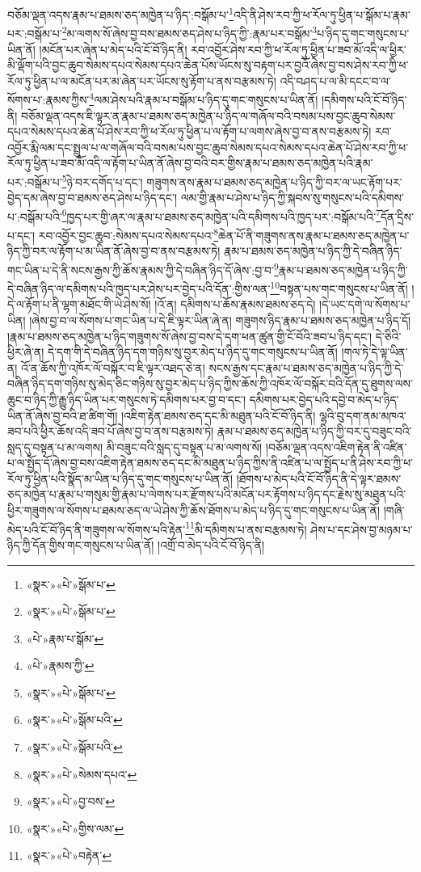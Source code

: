 བཅོམ་ལྡན་འདས་རྣམ་པ་ཐམས་ཅད་མཁྱེན་པ་ཉིད་:བསྒོམ་པ་\footnote{«སྣར་»«པེ་»སྒོམ་པ་}འདི་ནི་ཤེས་རབ་ཀྱི་ཕ་རོལ་ཏུ་ཕྱིན་པ་སྒོམ་པ་རྣམ་པར་:བསྒོམ་པ་\footnote{«སྣར་»«པེ་»སྒོམ་པ་}མ་ལགས་སོ་ཞེས་བྱ་བས་ཐམས་ཅད་ཤེས་པ་ཉིད་ཀྱི་:རྣམ་པར་བསྒོམ་\footnote{«པེ་»རྣམ་པ་སྒོམ་}པ་ཉིད་དུ་གང་གསུངས་པ་ཡིན་ནོ། །མངོན་པར་ཞེན་པ་མེད་པའི་ངོ་བོ་ཉིད་ནི། རབ་འབྱོར་ཤེས་རབ་ཀྱི་ཕ་རོལ་ཏུ་ཕྱིན་པ་ཟབ་མོ་འདི་ལ་ཕྱིར་མི་ལྡོག་པའི་བྱང་ཆུབ་སེམས་དཔའ་སེམས་དཔའ་ཆེན་པོས་ཡོངས་སུ་བརྟག་པར་བྱའོ་ཞེས་བྱ་བས་ཤེས་རབ་ཀྱི་ཕ་རོལ་ཏུ་ཕྱིན་པ་ལ་མངོན་པར་མ་ཞེན་པར་ཡོངས་སུ་རྟོག་པ་ནས་བརྩམས་ཏེ། འདི་བཤད་པ་ལ་མི་དངང་བ་ལ་སོགས་པ་:རྣམས་ཀྱིས་\footnote{«པེ་»རྣམས་ཀྱི་}ལམ་ཤེས་པའི་རྣམ་པ་བསྒོམ་པ་ཉིད་དུ་གང་གསུངས་པ་ཡིན་ནོ། །དམིགས་པའི་ངོ་བོ་ཉིད་ནི། བཅོམ་ལྡན་འདས་ཇི་ལྟར་ན་རྣམ་པ་ཐམས་ཅད་མཁྱེན་པ་ཉིད་ལ་གཞོལ་བའི་བསམ་པས་བྱང་ཆུབ་སེམས་དཔའ་སེམས་དཔའ་ཆེན་པོ་ཤེས་རབ་ཀྱི་ཕ་རོལ་ཏུ་ཕྱིན་པ་ལ་རྟོག་པ་ལགས་ཞེས་བྱ་བ་ནས་བརྩམས་ཏེ། རབ་འབྱོར་རྨི་ལམ་དང་སྤྲུལ་པ་ལ་གཞོལ་བའི་བསམ་པས་བྱང་ཆུབ་སེམས་དཔའ་སེམས་དཔའ་ཆེན་པོ་ཤེས་རབ་ཀྱི་ཕ་རོལ་ཏུ་ཕྱིན་པ་ཟབ་མོ་འདི་ལ་རྟོག་པ་ཡིན་ནོ་ཞེས་བྱ་བའི་བར་གྱིས་རྣམ་པ་ཐམས་ཅད་མཁྱེན་པའི་རྣམ་པར་:བསྒོམ་པ་\footnote{«སྣར་»«པེ་»སྒོམ་པ་}ཉེ་བར་དགོད་པ་དང་། གཟུགས་ནས་རྣམ་པ་ཐམས་ཅད་མཁྱེན་པ་ཉིད་ཀྱི་བར་ལ་ཡང་རྟོག་པར་བྱེད་དམ་ཞེས་བྱ་བ་ཐམས་ཅད་ཤེས་པ་ཉིད་དང་། ལམ་གྱི་རྣམ་པ་ཤེས་པ་ཉིད་ཀྱི་སྐབས་སུ་གསུངས་པའི་དམིགས་པ་:བསྒོམ་པའི་\footnote{«སྣར་»«པེ་»སྒོམ་པའི་}ཁྱད་པར་གྱི་ཞར་ལ་རྣམ་པ་ཐམས་ཅད་མཁྱེན་པའི་དམིགས་པའི་ཁྱད་པར་:བསྒོམ་པའི་\footnote{«སྣར་»«པེ་»སྒོམ་པའི་}དོན་དྲིས་པ་དང་། རབ་འབྱོར་བྱང་ཆུབ་:སེམས་དཔའ་སེམས་དཔའ་\footnote{«སྣར་»«པེ་»སེམས་དཔའ་}ཆེན་པོ་ནི་གཟུགས་ནས་རྣམ་པ་ཐམས་ཅད་མཁྱེན་པ་ཉིད་ཀྱི་བར་ལ་རྟོག་པ་མ་ཡིན་ནོ་ཞེས་བྱ་བ་ནས་བརྩམས་ཏེ། རྣམ་པ་ཐམས་ཅད་མཁྱེན་པ་ཉིད་ཀྱི་དེ་བཞིན་ཉིད་གང་ཡིན་པ་དེ་ནི་སངས་རྒྱས་ཀྱི་ཆོས་རྣམས་ཀྱི་དེ་བཞིན་ཉིད་དོ་ཞེས་:བྱ་བ་\footnote{«སྣར་»«པེ་»བྱ་བས་}རྣམ་པ་ཐམས་ཅད་མཁྱེན་པ་ཉིད་ཀྱི་དེ་བཞིན་ཉིད་ལ་དམིགས་པའི་ཁྱད་པར་ཤེས་པར་བྱེད་པའི་དོན་:གྱིས་ལན་\footnote{«སྣར་»«པེ་»གྱིས་ལམ་}བསྟན་པས་གང་གསུངས་པ་ཡིན་ནོ། །དེ་ལ་རྟོག་པ་ནི་ལྷག་མཐོང་གི་ཡེ་ཤེས་སོ། །འོ་ན། དམིགས་པ་ཆོས་རྣམས་ཐམས་ཅད་དེ། །དེ་ཡང་དགེ་ལ་སོགས་པ་ཡིན། །ཞེས་བྱ་བ་ལ་སོགས་པ་གང་ཡིན་པ་དེ་ཇི་ལྟར་ཡིན་ཞེ་ན། གཟུགས་ཉིད་རྣམ་པ་ཐམས་ཅད་མཁྱེན་པ་ཉིད་དོ། །རྣམ་པ་ཐམས་ཅད་མཁྱེན་པ་ཉིད་གཟུགས་སོ་ཞེས་བྱ་བས་དེ་དག་ཕན་ཚུན་གྱི་ངོ་བོའི་ཟབ་པ་ཉིད་དང་། དེ་ཅིའི་ཕྱིར་ཞེ་ན། དེ་དག་གི་དེ་བཞིན་ཉིད་དག་གཉིས་སུ་བྱར་མེད་པ་ཉིད་དུ་གང་གསུངས་པ་ཡིན་ནོ། །གལ་ཏེ་དེ་ལྟ་ཡིན་ན། འོ་ན་ཆོས་ཀྱི་འཁོར་ལོ་བསྐོར་བ་ཇི་ལྟར་འཐད་ཅེ་ན། སངས་རྒྱས་དང་རྣམ་པ་ཐམས་ཅད་མཁྱེན་པ་ཉིད་ཀྱི་དེ་བཞིན་ཉིད་དག་གཉིས་སུ་མེད་ཅིང་གཉིས་སུ་བྱར་མེད་པ་ཉིད་ཀྱིས་ཆོས་ཀྱི་འཁོར་ལོ་བསྐོར་བའི་དོན་དུ་ཐུགས་ལས་ཆུང་བ་ཉིད་ཀྱི་རྒྱུ་ཉིད་ཡིན་པར་གསུངས་ཏེ་དམིགས་པར་བྱ་བ་དང་། དམིགས་པར་བྱེད་པའི་དབྱེ་བ་མེད་པ་ཉིད་ཡིན་ནོ་ཞེས་བྱ་བའི་ཐ་ཚིག་གོ། །འཇིག་རྟེན་ཐམས་ཅད་དང་མི་མཐུན་པའི་ངོ་བོ་ཉིད་ནི། ལྷའི་བུ་དག་ནམ་མཁའ་ཟབ་པའི་ཕྱིར་ཆོས་འདི་ཟབ་པོ་ཞེས་བྱ་བ་ནས་བརྩམས་ཏེ། རྣམ་པ་ཐམས་ཅད་མཁྱེན་པ་ཉིད་ཀྱི་བར་དུ་བཟུང་བའི་སླད་དུ་བསྟན་པ་མ་ལགས། མི་བཟུང་བའི་སླད་དུ་བསྟན་པ་མ་ལགས་སོ། །བཅོམ་ལྡན་འདས་འཇིག་རྟེན་ནི་འཛིན་པ་ལ་སྤྱོད་དོ་ཞེས་བྱ་བས་འཇིག་རྟེན་ཐམས་ཅད་དང་མི་མཐུན་པ་ཉིད་ཀྱིས་ནི་འཛིན་པ་ལ་སྤྱོད་པ་ནི་ཤེས་རབ་ཀྱི་ཕ་རོལ་ཏུ་ཕྱིན་པའི་སྣོད་མ་ཡིན་པ་ཉིད་དུ་གང་གསུངས་པ་ཡིན་ནོ། །ཐོགས་པ་མེད་པའི་ངོ་བོ་ཉིད་ནི་དེ་ལྟར་ཐམས་ཅད་མཁྱེན་པ་རྣམ་པ་གསུམ་གྱི་རྣམ་པ་ལེགས་པར་རྫོགས་པའི་མངོན་པར་རྟོགས་པ་ཉིད་དང་རྗེས་སུ་མཐུན་པའི་ཕྱིར་གཟུགས་ལ་སོགས་པ་ཐམས་ཅད་ལ་ཡེ་ཤེས་ཀྱི་ཆོས་ཐོགས་པ་མེད་པ་ཉིད་དུ་གང་གསུངས་པ་ཡིན་ནོ། །གཞི་མེད་པའི་ངོ་བོ་ཉིད་ནི་གཟུགས་ལ་སོགས་པའི་རྟེན་\footnote{«སྣར་»«པེ་»བརྟེན་}མི་དམིགས་པ་ནས་བརྩམས་ཏེ། ཤེས་པ་དང་ཤེས་བྱ་མཉམ་པ་ཉིད་ཀྱི་དོན་གྱིས་གང་གསུངས་པ་ཡིན་ནོ། །འགྲོ་བ་མེད་པའི་ངོ་བོ་ཉིད་ནི། 